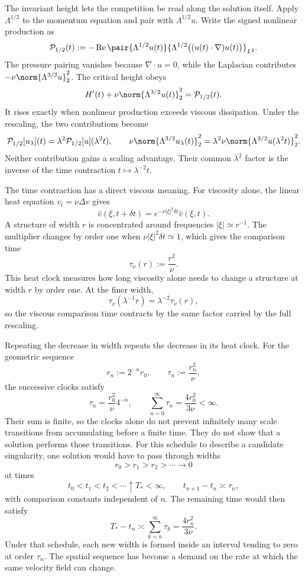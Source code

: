 
The invariant height lets the competition be read along the solution itself.
Apply \(\Lambda^{1/2}\) to the momentum equation and pair with \(\Lambda^{1/2}u\).
Write the signed nonlinear production as
\[
  \mathcal P_{1/2}(t)
  :=
  -\operatorname{Re}
  \pair
    {\Lambda^{1/2}u(t)}
    {\Lambda^{1/2}\bigl((u(t)\cdot\nabla)u(t)\bigr)}_{L^2}.
\]
The pressure pairing vanishes because \(\nabla\cdot u=0\), while the Laplacian contributes \(-\nu\norm{\Lambda^{3/2}u}_2^2\).
The critical height obeys
\[
  H'(t)
  +
  \nu\norm{\Lambda^{3/2}u(t)}_2^2
  =
  \mathcal P_{1/2}(t).
\]
It rises exactly when nonlinear production exceeds viscous dissipation.
Under the rescaling, the two contributions become
\[
  \mathcal P_{1/2}[u_\lambda](t)
  =
  \lambda^2\mathcal P_{1/2}[u](\lambda^2t),
  \qquad
  \nu\norm{\Lambda^{3/2}u_\lambda(t)}_2^2
  =
  \lambda^2\nu\norm{\Lambda^{3/2}u(\lambda^2t)}_2^2.
\]
Neither contribution gains a scaling advantage.
Their common \(\lambda^2\) factor is the inverse of the time contraction \(t\mapsto\lambda^{-2}t\).


The time contraction has a direct viscous meaning.
For viscosity alone, the linear heat equation \(v_t=\nu\Delta v\) gives
\[
  \widehat v(\xi,t+\delta t)
  =
  e^{-\nu|\xi|^2\delta t}\widehat v(\xi,t).
\]
A structure of width \(r\) is concentrated around frequencies \(|\xi|\simeq r^{-1}\).
The multiplier changes by order one when \(\nu|\xi|^2\delta t\simeq1\), which gives the comparison time
\[
  \tau_\nu(r)
  :=
  \frac{r^2}{\nu}.
\]
This heat clock measures how long viscosity alone needs to change a structure at width \(r\) by order one.
At the finer width,
\[
  \tau_\nu(\lambda^{-1}r)
  =
  \lambda^{-2}\tau_\nu(r),
\]
so the viscous comparison time contracts by the same factor carried by the full \NavierStokes{} rescaling.


Repeating the decrease in width repeats the decrease in its heat clock.
For the geometric sequence
\[
  r_n:=2^{-n}r_0,
  \qquad
  \tau_n:=\frac{r_n^2}{\nu},
\]
the successive clocks satisfy
\[
  \tau_n
  =
  \frac{r_0^2}{\nu}4^{-n},
  \qquad
  \sum_{n=0}^{\infty}\tau_n
  =
  \frac{4r_0^2}{3\nu}
  <
  \infty.
\]
Their sum is finite, so the clocks alone do not prevent infinitely many scale transitions from accumulating before a finite time.
They do not show that a \NavierStokes{} solution performs those transitions.
For this schedule to describe a candidate singularity, one solution would have to pass through widths
\[
  r_0>r_1>r_2>\cdots\longrightarrow0
\]
at times
\[
  t_0<t_1<t_2<\cdots\uparrow T_*<\infty,
  \qquad
  t_{n+1}-t_n\asymp\tau_n,
\]
with comparison constants independent of \(n\).
The remaining time would then satisfy
\[
  T_*-t_n
  \asymp
  \sum_{k=n}^{\infty}\tau_k
  =
  \frac{4r_n^2}{3\nu}.
\]
Under that schedule, each new width is formed inside an interval tending to zero at order \(\tau_n\).
The spatial sequence has become a demand on the rate at which the same velocity field can change.
